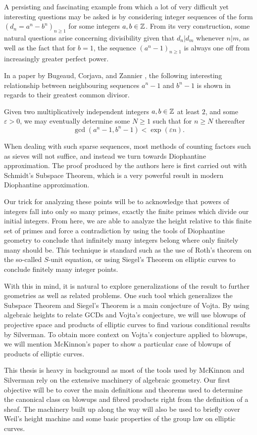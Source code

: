 A persisting and fascinating example from which a lot of very difficult yet interesting questions may be asked is by considering integer sequences of the form $(d_n = a^n - b^n)_{n \geq 1}$ for some integers $a, b \in \mathbb{Z}$.
From its very construction, some natural questions arise concerning divisibility given that $d_n | d_m$ whenever $n | m$,
as well as the fact that for $b = 1$, the sequence $(a^n - 1)_{n \geq 1}$ is always one off from increasingly greater perfect power.

In a paper by Bugeaud, Corjava, and Zannier \cite{BCZ_2002}, the following interesting relationship between neighbouring sequences $a^n - 1$ and $b^n - 1$ is shown in regards to their greatest common divisor.

\begin{theorem}
    Given two multiplicatively independent integers $a, b \in \mathbb{Z}$ at least $2$, and some $\varepsilon > 0$,
    we may eventually determine some $N \geq 1$ such that for $n \geq N$ thereafter
    \[
        \gcd(a^n - 1, b^n - 1) < \exp(\varepsilon n).
    \]
\end{theorem}

When dealing with such sparse sequences,
most methods of counting factors such as sieves will not suffice, and instead we turn towards Diophantine approximation.
The proof produced by the authors here is first carried out with Schmidt's Subspace Theorem, 
which is a very powerful result in modern Diophantine approximation.

Our trick for analyzing these points will be to acknowledge that powers of integers fall into only so many primes,
exactly the finite primes which divide our initial integers.
From here, we are able to analyze the height relative to this finite set of primes and force a contradiction by using the tools of Diophantine geometry to conclude that infinitely many integers belong where only finitely many should be.
This technique is standard such as the use of Roth's theorem on the so-called $S$-unit equation,
or using Siegel's Theorem on elliptic curves to conclude finitely many integer points.

With this in mind, it is natural to explore generalizations of the \cite{BCZ_2002} result to further geometries as well as related problems.
One such tool which generalizes the Subspace Theorem and Siegel's Theorem is a main conjecture of Vojta.
By using algebraic heights to relate GCDs and Vojta's conjecture, 
we will use blowups of projective space and products of elliptic curves to find various conditional results by Silverman.
To obtain more context on Vojta's conjecture applied to blowups,
we will mention McKinnon's paper to show a particular case of blowups of products of elliptic curves.

This thesis is heavy in background as most of the tools used by McKinnon and Silverman rely on the extensive machinery of algebraic geometry. 
Our first objective will be to cover the main definitions and theorems used to determine the canonical class on blowups and fibred products right from the definition of a sheaf.
The machinery built up along the way will also be used to briefly cover Weil's height machine and
some basic properties of the group law on elliptic curves.
